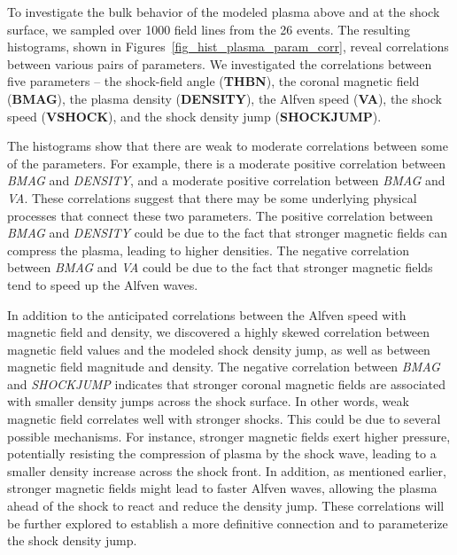 To investigate the bulk behavior of the modeled plasma above and at the shock surface, we sampled over 1000 field lines from the 26 events. The resulting histograms, shown in Figures~\ref{fig_hist_plasma_param_corr}, reveal correlations between various pairs of parameters. 
We investigated the correlations between five parameters -- the shock-field angle (\textbf{THBN}), the coronal magnetic field (\textbf{BMAG}), the plasma density (\textbf{DENSITY}), the Alfven speed (\textbf{VA}), the shock speed (\textbf{VSHOCK}), and the shock density jump (\textbf{SHOCKJUMP}).

The histograms show that there are weak to moderate correlations between some of the parameters.
For example, there is a moderate positive correlation between \textit{BMAG} and \textit{DENSITY}, and a moderate positive correlation between \textit{BMAG} and \textit{VA}. These correlations suggest that there may be some underlying physical processes that connect these two parameters.
The positive correlation between \textit{BMAG} and \textit{DENSITY} could be due to the fact that stronger magnetic fields can compress the plasma, leading to higher densities.
The negative correlation between \textit{BMAG} and \textit{VA} could be due to the fact that stronger magnetic fields tend to speed up the Alfven waves.

In addition to the anticipated correlations between the Alfven speed with magnetic field and density, we discovered a highly skewed correlation between magnetic field values and the modeled shock density jump, as well as between magnetic field magnitude and density.
The negative correlation between \textit{BMAG} and \textit{SHOCKJUMP} indicates that stronger coronal magnetic fields are associated with smaller density jumps across the shock surface. In other words, weak magnetic field correlates well with stronger shocks.
This could be due to several possible mechanisms. For instance, stronger magnetic fields exert higher pressure, potentially resisting the compression of plasma by the shock wave, leading to a smaller density increase across the shock front.
In addition, as mentioned earlier, stronger magnetic fields might lead to faster Alfven waves, allowing the plasma ahead of the shock to react and reduce the density jump.
These correlations will be further explored to establish a more definitive connection and to parameterize the shock density jump.

